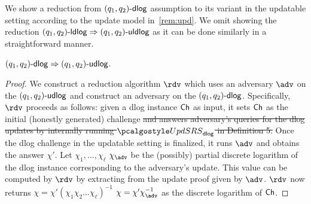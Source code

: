 { 

We show a reduction from $(q_1, q_2)\text{-}\mathsf{dlog}$ assumption to its variant in the updatable setting according to the update model in~\cref{rem:upd}. We omit showing the reduction $(q_1, q_2)\text{-}\mathsf{ldlog} \Rightarrow (q_1, q_2)\text{-}\mathsf{uldlog}$ as it can be done similarly in a straightforward manner.
\begin{lemma}
	$(q_1, q_2)\text{-}\mathsf{dlog} \Rightarrow (q_1, q_2)\text{-}\mathsf{udlog}$.
	\end{lemma}
\begin{proof}
	We construct a reduction algorithm $\reduction$ which uses an adversary $\adv$ on the $(q_1, q_2)\text{-}\mathsf{udlog}$ and construct an adversary on the $(q_1, q_2)\text{-}\mathsf{dlog}$. Specifically, $\reduction$ proceeds as follows: given a dlog instance $\mathsf{Ch}$ as input, it sets $\mathsf{Ch}$ as the initial (honestly generated) challenge \sout{and answers adversary's queries for the dlog updates by internally running $\upd_{\dlog}$ in Definition 5.} Once the dlog challenge in the updatable setting is finalized, it runs $\adv$ and obtains the answer $\chi'$. Let \sout{$\chi_1, \ldots, \chi_\ell$} $\chi_\adv$ be the (possibly) partial discrete logarithm of the dlog instance corresponding to the adversary's update. This value can be computed by $\reduction$ by extracting from the update proof given by $\adv$. $\reduction$ now returns  
	\sout{$\chi = \chi' (\chi_1 \chi_2 \ldots \chi_\ell)^{-1}$} $\chi = \chi' \chi_\adv^{-1}$ as the discrete logarithm of $\mathsf{Ch}$. %
	\end{proof}
}

